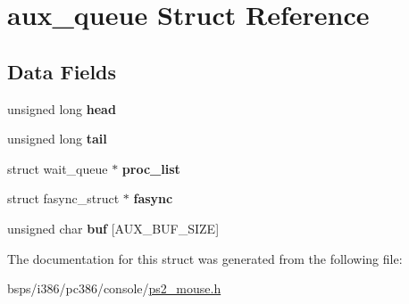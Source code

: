 \hypertarget{structaux__queue}{}\section{aux\+\_\+queue Struct Reference}
\label{structaux__queue}
\subsection*{Data Fields}
\begin{DoxyCompactItemize}
\item 
\mbox{\label{structaux__queue_aef1ff14d6a4501a0c33220a6bffa31f4}} 
unsigned long {\bfseries head}
\item 
\mbox{\label{structaux__queue_a56949d99b65e8ce185bdf4c8d0274537}} 
unsigned long {\bfseries tail}
\item 
\mbox{\label{structaux__queue_ac451a04b08b7bfffd9712d12f3b10f40}} 
struct wait\+\_\+queue $\ast$ {\bfseries proc\+\_\+list}
\item 
\mbox{\label{structaux__queue_aacaa5c5c9f7b017ae3816becaa70b52f}} 
struct fasync\+\_\+struct $\ast$ {\bfseries fasync}
\item 
\mbox{\label{structaux__queue_ae615c1b58355d97caa0d4d1962292f09}} 
unsigned char {\bfseries buf} \mbox{[}A\+U\+X\+\_\+\+B\+U\+F\+\_\+\+S\+I\+ZE\mbox{]}
\end{DoxyCompactItemize}


The documentation for this struct was generated from the following file\+:\begin{DoxyCompactItemize}
\item 
bsps/i386/pc386/console/\mbox{\hyperlink{ps2__mouse_8h}{ps2\+\_\+mouse.\+h}}\end{DoxyCompactItemize}
